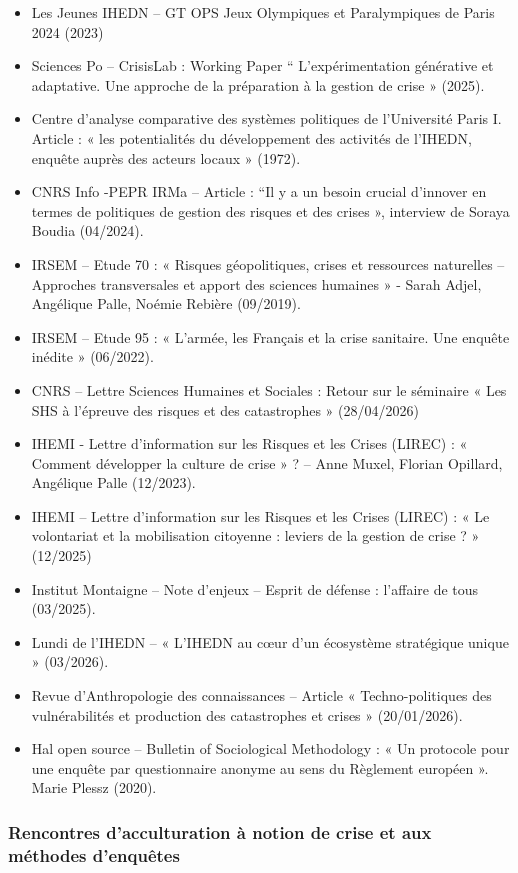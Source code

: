 \documentclass[10pt,a4paper]{article}
\begin{document}
\begin{itemize}
\item Les Jeunes IHEDN -- GT OPS Jeux Olympiques et Paralympiques de Paris 2024 (2023)
\item Sciences Po -- CrisisLab : Working Paper “ L'expérimentation générative et adaptative. Une approche de la préparation à la gestion de crise » (2025).
\item Centre d'analyse comparative des systèmes politiques de l'Université Paris I. Article : « les potentialités du développement des activités de l'IHEDN, enquête auprès des acteurs locaux » (1972).
\item CNRS Info -PEPR IRMa -- Article : “Il y a un besoin crucial d'innover en termes de politiques de gestion des risques et des crises », interview de Soraya Boudia (04/2024).
\item IRSEM -- Etude 70 : « Risques géopolitiques, crises et ressources naturelles -- Approches transversales et apport des sciences humaines » - Sarah Adjel, Angélique Palle, Noémie Rebière (09/2019).
\item IRSEM -- Etude 95 : « L'armée, les Français et la crise sanitaire. Une enquête inédite » (06/2022). 
\item CNRS -- Lettre Sciences Humaines et Sociales : Retour sur le séminaire « Les SHS à l'épreuve des risques et des catastrophes » (28/04/2026)
\item IHEMI - Lettre d'information sur les Risques et les Crises (LIREC) : « Comment développer la culture de crise » ? -- Anne Muxel, Florian Opillard, Angélique Palle (12/2023).
\item IHEMI -- Lettre d'information sur les Risques et les Crises (LIREC) : « Le volontariat et la mobilisation citoyenne : leviers de la gestion de crise ? » (12/2025)
\item Institut Montaigne -- Note d'enjeux -- Esprit de défense : l'affaire de tous (03/2025).
\item Lundi de l'IHEDN -- « L'IHEDN au cœur d'un écosystème stratégique unique » (03/2026).
\item Revue d'Anthropologie des connaissances -- Article « Techno-politiques des vulnérabilités et production des catastrophes et crises » (20/01/2026).
\item Hal open source -- Bulletin of Sociological Methodology  : « Un protocole pour une enquête par questionnaire anonyme au sens du Règlement européen ». Marie Plessz (2020).
\end{itemize}

\subsubsection{Rencontres d'acculturation à notion de crise et aux méthodes d'enquêtes}
\end{document}
